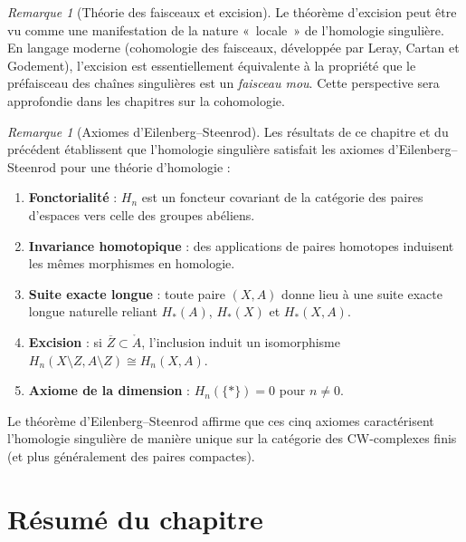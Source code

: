 \documentclass[12pt,a4paper,openany]{book}
\theoremstyle{definition}
\theoremstyle{plain}
\theoremstyle{remark}
\newtheorem{remarque}[definition]{Remarque}
\begin{document}
\begin{remarque}[Théorie des faisceaux et excision]\label{rem:faisceaux-excision}
Le théorème d'excision peut être vu comme une manifestation de la nature «~locale~» de
l'homologie singulière. En langage moderne (cohomologie des faisceaux, développée par
Leray, Cartan et Godement), l'excision est essentiellement équivalente à la propriété que le
préfaisceau des chaînes singulières est un \emph{faisceau mou}. Cette perspective sera
approfondie dans les chapitres sur la cohomologie.
\end{remarque}

\begin{remarque}[Axiomes d'Eilenberg--Steenrod]\label{rem:eilenberg-steenrod}
Les résultats de ce chapitre et du précédent établissent que l'homologie singulière satisfait
les axiomes d'Eilenberg--Steenrod pour une théorie d'homologie :
\begin{enumerate}[label=(ES\arabic*)]
  \item \textbf{Fonctorialité} : $H_n$ est un foncteur covariant de la catégorie des paires
  d'espaces vers celle des groupes abéliens.
  \item \textbf{Invariance homotopique} : des applications de paires homotopes induisent les
  mêmes morphismes en homologie.
  \item \textbf{Suite exacte longue} : toute paire $(X, A)$ donne lieu à une suite exacte longue
  naturelle reliant $H_*(A)$, $H_*(X)$ et $H_*(X, A)$.
  \item \textbf{Excision} : si $\overline{Z} \subset \mathring{A}$, l'inclusion induit un
  isomorphisme $H_n(X \setminus Z, A \setminus Z) \cong H_n(X, A)$.
  \item \textbf{Axiome de la dimension} : $H_n(\{*\}) = 0$ pour $n \neq 0$.
\end{enumerate}
Le théorème d'Eilenberg--Steenrod affirme que ces cinq axiomes caractérisent l'homologie
singulière de manière unique sur la catégorie des CW-complexes finis (et plus généralement
des paires compactes).
\end{remarque}

\section*{Résumé du chapitre}\label{sec:resume-ch6}
\end{document}
